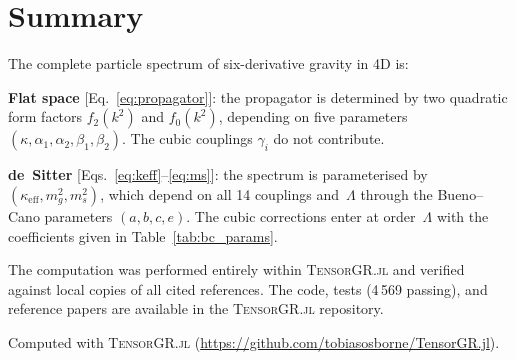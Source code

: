 \documentclass[aps,prd,twocolumn,superscriptaddress,nofootinbib]{revtex4-2}
\newcommand{\TGR}{\textsc{TensorGR.jl}}
\begin{document}
\section{Summary}

The complete particle spectrum of six-derivative gravity in 4D is:

\medskip\noindent
\textbf{Flat space} [Eq.~\eqref{eq:propagator}]:
the propagator is determined by two quadratic form factors
$f_2(k^2)$ and $f_0(k^2)$, depending on five parameters
$(\kappa, \alpha_1, \alpha_2, \beta_1, \beta_2)$.  The cubic
couplings $\gamma_i$ do not contribute.

\medskip\noindent
\textbf{de~Sitter} [Eqs.~\eqref{eq:keff}--\eqref{eq:ms}]:
the spectrum is parameterised by $(\kappa_\mathrm{eff}, m_g^2, m_s^2)$,
which depend on all 14 couplings and~$\Lambda$ through the Bueno--Cano
parameters $(a,b,c,e)$.  The cubic corrections enter at order~$\Lambda$
with the coefficients given in Table~\ref{tab:bc_params}.

\medskip\noindent
The computation was performed entirely within \TGR{} and verified
against local copies of all cited references.  The code, tests
(4\,569 passing), and reference papers are available in the
\TGR{} repository.

\begin{acknowledgments}
Computed with \TGR{} (\url{https://github.com/tobiasosborne/TensorGR.jl}).
\end{acknowledgments}
\end{document}
